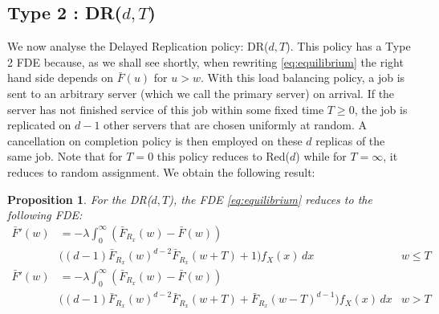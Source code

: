 \documentclass[12pt]{report}
\newtheorem{proposition}[theorem]{Proposition}
\begin{document}
\subsection{Type 2 : DR($d,T$)}
We now analyse the Delayed Replication policy: DR($d,T$). This policy has a Type 2 FDE because, as we shall see shortly, when rewriting \eqref{eq:equilibrium} the right hand side depends on $\bar F(u)$ for $u > w$. With this load balancing policy, a job is sent to an arbitrary server (which we call the primary server) on arrival. If the server has not finished service of this job within some fixed time $T\geq 0$, the job is  replicated on $d-1$ other servers that are chosen uniformly at random. A cancellation on completion policy is then employed on these $d$ replicas of the same job. Note that for $T=0$ this policy reduces to Red($d$) while for $T=\infty$, it reduces to random assignment. We obtain the following result:
\begin{proposition}\label{prop:DR}
For the DR($d,T$), the FDE \eqref{eq:equilibrium} reduces to the following FDE:
\begin{align}
\bar F'(w)
&= -\lambda \int_0^\infty (\bar F_{R_x}(w) - \bar F(w) ) \nonumber \\
&\bigg((d-1)\bar F_{R_x}(w)^{d-2} \bar F_{R_x}(w+T)+1\bigg) f_X(x) \, dx & w \leq T \label{eq:thm_red_long1} \\
\bar F'(w)
&= - \lambda \int_0^\infty \left( \bar F_{R_x}(w) - \bar F(w) \right) \nonumber \\
&  \bigg((d-1) \bar F_{R_x}(w)^{d-2} \bar F_{R_x}(w+T) + \bar F_{R_x}(w-T)^{d-1}\bigg) f_X(x)\, dx & w >T \label{eq:thm_red_long2}
\end{align}
\end{proposition}
\end{document}
